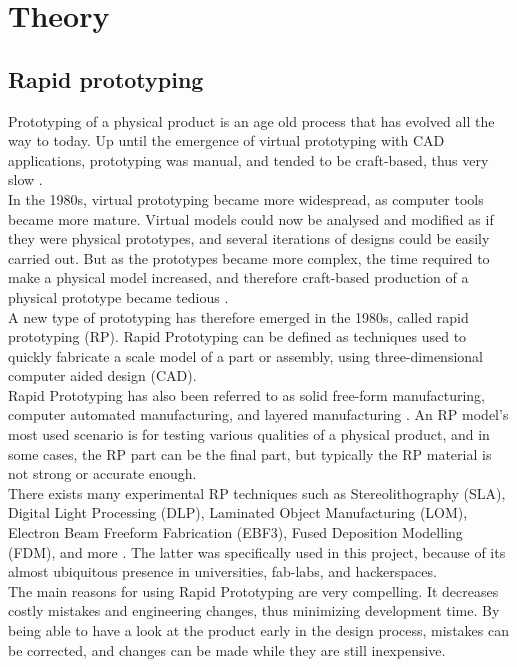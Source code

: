 \section{Theory}
\subsection{Rapid prototyping}

Prototyping of a physical product is an age old process that has evolved all the way to today. Up until the emergence of virtual prototyping with CAD applications, prototyping was manual, and tended to be craft-based, thus very slow \cite{chua2010}. \\
In the 1980s, virtual prototyping became more widespread, as computer tools became more mature. Virtual models could now be analysed and modified as if they were physical prototypes, and several iterations of designs could be easily carried out. But as the prototypes became more complex, the time required to make a physical model increased, and therefore craft-based production of a physical prototype became tedious \cite{chua2010}. \\

A new type of prototyping has therefore emerged in the 1980s, called rapid prototyping (RP). Rapid Prototyping can be defined as techniques used to quickly fabricate a scale model of a part or assembly, using three-dimensional computer aided design (CAD). \\

Rapid Prototyping has also been referred to as solid free-form manufacturing, computer automated manufacturing, and layered manufacturing \cite{efunda}. An RP model's most used scenario is for testing various qualities of a physical product, and in some cases, the RP part can be the final part, but typically the RP material is not strong or accurate enough. \\

There exists many experimental RP techniques such as Stereolithography (SLA), Digital Light Processing (DLP), Laminated Object Manufacturing (LOM), Electron Beam Freeform Fabrication (EBF3), Fused Deposition Modelling (FDM), and more \cite{wiki3D}. The latter was specifically used in this project, because of its almost ubiquitous presence in universities, fab-labs, and hackerspaces. \\

The main reasons for using Rapid Prototyping are very compelling. It decreases costly mistakes and engineering changes, thus minimizing development time. By being able to have a look at the product early in the design process, mistakes can be corrected, and changes can be made while they are still inexpensive. \\

